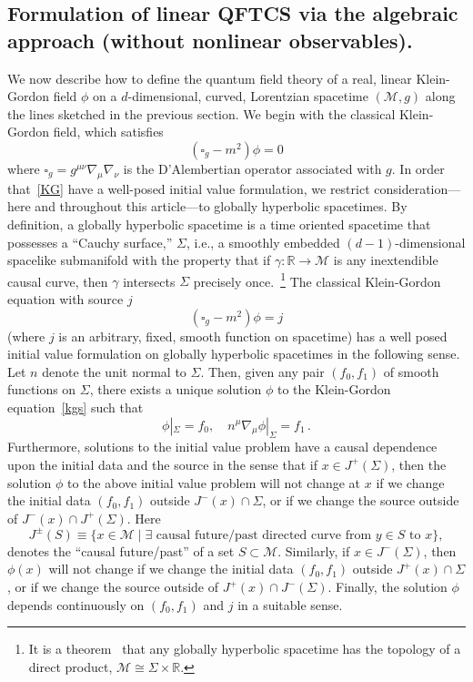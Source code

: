 \documentclass[12pt]{article}
\newcommand{\M}{\mathscr{M}}
\newcommand{\mr}{\mathbb{R}}
\theoremstyle{plain}
\theoremstyle{definition}
\def\ben{\begin{equation}}
\def\een{\end{equation}}
\begin{document}
\subsection{Formulation of linear QFTCS via the algebraic approach (without
nonlinear observables).}
We now describe how to define the quantum field theory of a real, linear
Klein-Gordon field $\phi$ on a $d$-dimensional, curved, Lorentzian
spacetime $(\M,g)$ along the lines sketched in the previous section.
We begin with the classical Klein-Gordon field, which satisfies
\ben\label{KG}
(\square_g - m^2)\phi = 0
\een
where $\square_g = g^{\mu\nu} \nabla_\mu \nabla_\nu$ is the D'Alembertian operator associated with $g$. In order that~\eqref{KG} have a well-posed initial value
formulation, we restrict consideration---here and throughout this article---to globally hyperbolic spacetimes. By definition, a globally hyperbolic spacetime is a time oriented spacetime that possesses
a ``Cauchy surface,'' $\Sigma$, i.e., a smoothly
embedded $(d-1)$-dimensional spacelike submanifold with the property that if
$\gamma: \mr \to \M$ is any inextendible causal curve, then $\gamma$
intersects $\Sigma$ precisely once.~\footnote{It is a theorem~\cite{sanchez} that any globally
hyperbolic spacetime has the topology of a direct product,
$\M \cong \Sigma \times \mr$.}
The classical Klein-Gordon equation with source $j$
\ben
(\square_g - m^2)\phi = j
\label{kgs}
\een
(where $j$ is an arbitrary, fixed, smooth function on spacetime) has a well posed initial value formulation on globally hyperbolic spacetimes in the following sense.
Let $n$ denote the unit normal to $\Sigma$. Then, given any pair $(f_0,f_1)$ of smooth functions
on $\Sigma$, there exists a unique
solution $\phi$ to the Klein-Gordon equation~\eqref{kgs} such that
\ben\label{data}
\phi |_{\Sigma} = f_0, \quad n^\mu \nabla_\mu \phi |_{\Sigma} = f_1 \, .
\een
Furthermore, solutions to the initial value problem have a causal dependence upon
the initial data and the source in the sense that if $x \in J^+(\Sigma)$,
then the solution $\phi$ to the above initial value problem will not change at $x$ if
we change the initial data $(f_0,f_1)$ outside $J^-(x) \cap \Sigma$,
or if we change the source outside of $J^-(x) \cap J^+(\Sigma)$. Here
\ben
J^\pm(S) \equiv \{x \in \M \mid \text{$\exists$ causal future/past directed
curve from $y \in S$ to $x$}\},
\een
denotes the ``causal future/past'' of a set $S \subset
\M$. Similarly, if $x \in J^-(\Sigma)$, then $\phi(x)$ will not change if
we change the initial data $(f_0,f_1)$ outside $J^+(x) \cap \Sigma$,
or if we change the source outside of $J^+(x) \cap J^-(\Sigma)$. Finally, the solution $\phi$
depends continuously on $(f_0, f_1)$ and $j$ in a suitable sense.
\end{document}
